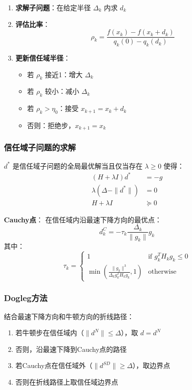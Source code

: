 \begin{enumerate}
    \item \textbf{求解子问题}：在给定半径 $\Delta_k$ 内求 $d_k$
    \item \textbf{评估比率}：
    \[
    \rho_k = \frac{f(x_k) - f(x_k + d_k)}{q_k(0) - q_k(d_k)}
    \]
    \item \textbf{更新信任域半径}：
    \begin{itemize}
        \item 若 $\rho_k$ 接近1：增大 $\Delta_k$
        \item 若 $\rho_k$ 较小：减小 $\Delta_k$
        \item 若 $\rho_k > \eta_0$：接受 $x_{k+1} = x_k + d_k$
        \item 否则：拒绝步，$x_{k+1} = x_k$
    \end{itemize}
\end{enumerate}

\subsubsection{信任域子问题的求解}

\begin{theorem}[子问题最优性条件]
$d^*$ 是信任域子问题的全局最优解当且仅当存在 $\lambda \geq 0$ 使得：
\begin{align}
(H + \lambda I)d^* &= -g \\
\lambda(\Delta - \|d^*\|) &= 0 \\
H + \lambda I &\succeq 0
\end{align}
\end{theorem}

\textbf{Cauchy点}：
在信任域内沿最速下降方向的最优点：
\[
d_k^C = -\tau_k \frac{\Delta_k}{\|g_k\|} g_k
\]
其中：
\[
\tau_k = \begin{cases} 1 & \text{if } g_k^T H_k g_k \leq 0 \\ \min\left(\frac{\|g_k\|^3}{\Delta_k g_k^T H_k g_k}, 1\right) & \text{otherwise} \end{cases}
\]

\subsubsection{Dogleg方法}

\begin{conceptbox}[Dogleg方法]
结合最速下降方向和牛顿方向的折线路径：
\begin{enumerate}
    \item 若牛顿步在信任域内（$\|d^N\| \leq \Delta$），取 $d = d^N$
    \item 否则，沿最速下降到Cauchy点的路径
    \item 若Cauchy点在信任域外（$\|d^{SD}\| \geq \Delta$），取边界点
    \item 否则在折线路径上取信任域边界点
\end{enumerate}
\end{conceptbox}

